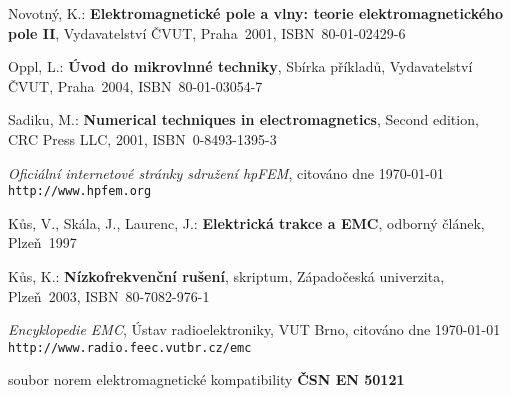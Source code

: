 
%


\begin{thebibliography}{9}
{\sc Novotný, K.:}  {\bf Elektromagnetické pole a vlny: teorie elektromagnetického pole II},
Vydavatelství ČVUT, Praha~2001, \mbox{ISBN 80-01-02429-6}

{\sc Oppl, L.:}  {\bf Úvod do mikrovlnné techniky},
Sbírka příkladů, Vydavatelství ČVUT, Praha~2004, \mbox{ISBN 80-01-03054-7}

{\sc Sadiku, M.:} {\bf Numerical techniques in electromagnetics},
Second edition, CRC Press LLC, 2001, \mbox{ISBN 0-8493-1395-3}

{\em Oficiální internetové stránky sdružení hpFEM},
citováno dne \today \\
\texttt{http://www.hpfem.org}

{\sc Kůs, V., Skála, J., Laurenc, J.:}  {\bf Elektrická trakce a EMC},
odborný článek, Plzeň~1997

{\sc Kůs, K.:}  {\bf Nízkofrekvenční rušení},
skriptum, Západočeská univerzita, Plzeň~2003, \mbox{ISBN 80-7082-976-1}

{\em Encyklopedie EMC}, Ústav radioelektroniky, VUT Brno,
citováno dne \today \\
\texttt{http://www.radio.feec.vutbr.cz/emc}

soubor norem elektromagnetické kompatibility  {\bf ČSN EN 50121}

\end{thebibliography}

